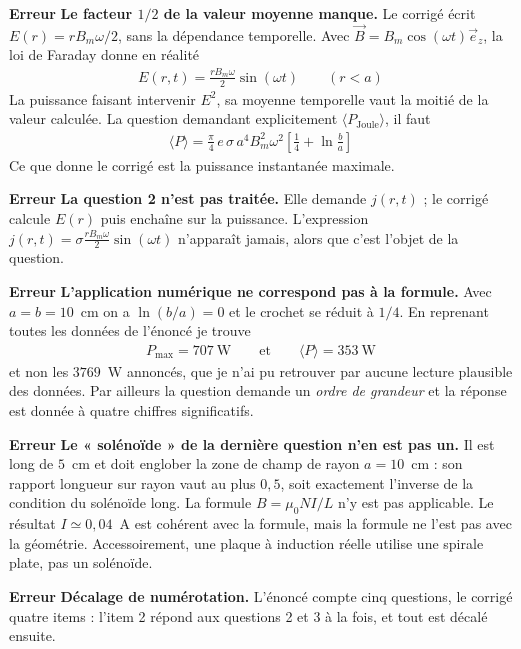 \documentclass[a4paper,11pt]{article}
\newcommand{\erreur}{\textcolor{BrickRed}{\textbf{Erreur}}}
\begin{document}
\medskip
\erreur{} \textbf{Le facteur $1/2$ de la valeur moyenne manque.} Le corrigé écrit
$E(r)=rB_m\omega/2$, sans la dépendance temporelle. Avec $\vec B=B_m\cos(\omega t)\vec e_z$, la loi de
Faraday donne en réalité
\begin{align*}
	E(r,t)=\frac{rB_m\omega}{2}\sin(\omega t) \qquad (r<a)
\end{align*}
La puissance faisant intervenir $E^2$, sa moyenne temporelle vaut la moitié de la valeur calculée.
La question demandant explicitement $\langle P_{\mathrm{Joule}}\rangle$, il faut
\begin{align*}
	\langle P\rangle=\frac{\pi}{4}\,e\,\sigma\,a^4B_m^2\omega^2\left[\frac14+\ln\frac{b}{a}\right]
\end{align*}
Ce que donne le corrigé est la puissance instantanée maximale.

\medskip
\erreur{} \textbf{La question 2 n'est pas traitée.} Elle demande $j(r,t)$ ; le corrigé calcule $E(r)$
puis enchaîne sur la puissance. L'expression $j(r,t)=\sigma\frac{rB_m\omega}{2}\sin(\omega t)$
n'apparaît jamais, alors que c'est l'objet de la question.

\medskip
\erreur{} \textbf{L'application numérique ne correspond pas à la formule.} Avec $a=b=10$~cm on a
$\ln(b/a)=0$ et le crochet se réduit à $1/4$. En reprenant toutes les données de l'énoncé je trouve
\begin{align*}
	P_{\mathrm{max}}=707~\mathrm{W} \qquad\text{et}\qquad \langle P\rangle=353~\mathrm{W}
\end{align*}
et non les $3769$~W annoncés, que je n'ai pu retrouver par aucune lecture plausible des données. Par
ailleurs la question demande un \textit{ordre de grandeur} et la réponse est donnée à quatre chiffres
significatifs.

\medskip
\erreur{} \textbf{Le « solénoïde » de la dernière question n'en est pas un.} Il est long de $5$~cm et
doit englober la zone de champ de rayon $a=10$~cm : son rapport longueur sur rayon vaut au plus
$0{,}5$, soit exactement l'inverse de la condition du solénoïde long. La formule $B=\mu_0NI/L$ n'y est
pas applicable. Le résultat $I\simeq0{,}04$~A est cohérent avec la formule, mais la formule ne l'est
pas avec la géométrie. Accessoirement, une plaque à induction réelle utilise une spirale plate, pas
un solénoïde.

\medskip
\erreur{} \textbf{Décalage de numérotation.} L'énoncé compte cinq questions, le corrigé quatre items :
l'item 2 répond aux questions 2 et 3 à la fois, et tout est décalé ensuite.
\end{document}
